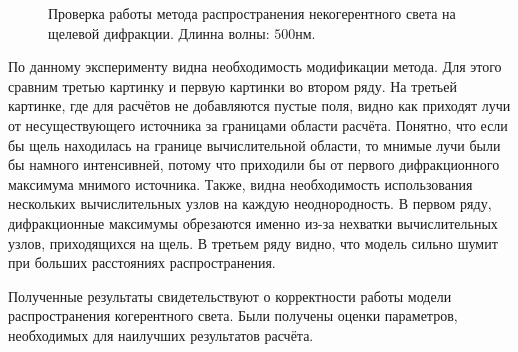 \begin{figure}[h]
	\caption{Проверка работы метода распространения некогерентного света на щелевой дифракции. Длинна волны: $500$нм.}
	\label{ris:PropagationSlit}
\end{figure}
По данному эксперименту видна необходимость модификации метода. Для этого сравним третью картинку и первую картинки во втором ряду. На третьей картинке, где для расчётов не добавляются пустые поля, видно как приходят лучи от несуществующего источника за границами области расчёта. Понятно, что если бы щель находилась на границе вычислительной области, то мнимые лучи были бы намного интенсивней, потому что приходили бы от первого дифракционного максимума мнимого источника. Также, видна необходимость использования нескольких вычислительных узлов на каждую неоднородность. В первом ряду, дифракционные максимумы обрезаются именно из-за нехватки вычислительных узлов, приходящихся на щель. В третьем ряду видно, что модель сильно шумит при больших расстояниях распространения.
\par
Полученные результаты свидетельствуют о корректности работы модели распространения когерентного света. Были получены оценки параметров, необходимых для наилучших результатов расчёта.




